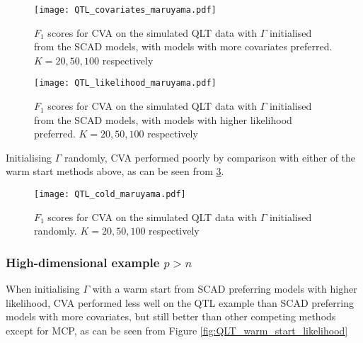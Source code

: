 \begin{figure}\label{fig:QLT_warm_start_covariates}
\caption{$F_1$ scores for CVA on the simulated QLT data with $\Gamma$ initialised from the SCAD models, with
models with more covariates preferred. $K=20, 50, 100$ respectively}
\texttt{[image: QTL\_covariates\_maruyama.pdf]}

\end{figure}

\begin{figure}\label{fig:QLT_warm_start_covariates}
\caption{$F_1$ scores for CVA on the simulated QLT data with $\Gamma$ initialised from the SCAD models, with
models with higher likelihood preferred. $K=20, 50, 100$ respectively}
\texttt{[image: QTL\_likelihood\_maruyama.pdf]}
\end{figure}


Initialising $\Gamma$ randomly, CVA performed poorly by comparison with either of the warm start methods
above, as can be seen from \ref{fig:QLT_cold_start}.
\begin{figure}\label{fig:QLT_cold_start}
\caption{$F_1$ scores for CVA on the simulated QLT data with $\Gamma$ initialised randomly. $K=20, 50, 100$ respectively}
\texttt{[image: QTL\_cold\_maruyama.pdf]}

\end{figure}


\subsubsection{High-dimensional example $p > n$}
When initialising $\Gamma$ with a warm start from SCAD preferring models with higher likelihood,
CVA performed less well on the QTL example than SCAD preferring models with more covariates, but still
better than other competing methods except for MCP,
as can be seen from Figure \ref{fig:QLT_warm_start_likelihood}

